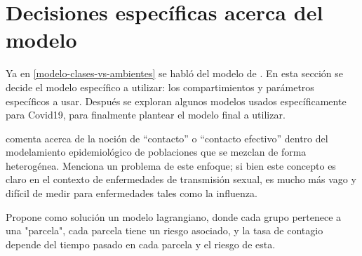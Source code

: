 \section{Decisiones específicas acerca del modelo} \label{met:decisiones}








Ya en \ref{modelo-clases-vs-ambientes} se habló del modelo de \cite{Bichara2015}. En esta sección se decide el modelo específico a utilizar: los compartimientos y parámetros específicos a usar. Después se exploran algunos modelos usados específicamente para Covid19, para finalmente plantear el modelo final a utilizar.




\cite{Bichara2015} comenta acerca de la noción de ``contacto'' o ``contacto efectivo'' dentro del modelamiento epidemiológico de poblaciones que se mezclan de forma heterogénea. Menciona un problema de este enfoque; si bien este concepto es claro en el contexto de enfermedades de transmisión sexual, es mucho más vago y difícil de medir para enfermedades tales como la influenza.

Propone como solución un modelo lagrangiano, donde cada grupo pertenece a una "parcela", cada parcela tiene un riesgo asociado, y la tasa de contagio depende del tiempo pasado en cada parcela y el riesgo de esta.

